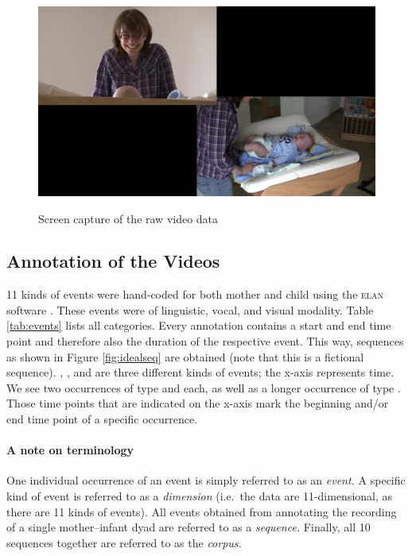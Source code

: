 \begin{figure}[h]
	\centering
	\includegraphics[width=\imgwidth]{../aux/img/video_vp_08_raw.png}
	\label{fig:rawvid}
	\caption{Screen capture of the raw video data}
\end{figure}

\subsection{Annotation of the Videos}
\label{ssec:miningmethodannotation}
11 kinds of events were hand-coded for both mother and child using the \textsc{elan} software \citep{wittenburg06}. These events were of linguistic, vocal, and visual modality. %
Table \ref{tab:events} lists all categories. Every annotation contains a start and end time point and therefore also the duration of the respective event. This way, sequences as shown in Figure \ref{fig:idealseq} are obtained (note that this is a fictional sequence). , , and  are three different kinds of events; the x-axis represents time. We see two occurrences of type  and  each, as well as a longer occurrence of type . Those time points that are indicated on the x-axis mark the beginning and/or end time point of a specific occurrence.
\paragraph{A note on terminology}
One individual occurrence of an event is simply referred to as an \emph{event.}
A specific kind of event is referred to as a \emph{dimension} (i.e.~the data are 11-dimensional, as there are 11 kinds of events).
All events obtained from annotating the recording of a single mother--infant dyad are referred to as a \emph{sequence.}
Finally, all 10 sequences together are referred to as the \emph{corpus.}


